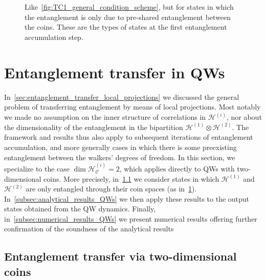 \documentclass[
	aps, pra,
	superscriptaddress, twocolumn,
	floatfix,
	10pt
]{revtex4-1}
\newcommand{\calC}{{\mathcal{C}}}
\newcommand{\calH}{{\mathcal{H}}}
\newcommand{\HC}{\calH_\calC}
\begin{document}
\begin{figure}
    \centering
    
    \caption{
        Like~\cref{fig:TC1_general_condition_scheme}, but for states in which the entanglement is only due to pre-shared entanglement between the coins. These are the types of states at the first entanglement accumulation step.
    }
    \label{fig:TC1_condition_scheme}
\end{figure}

\section{Entanglement transfer in QWs}
\label{sec:entanglement_transfer_in_QWs}

In~\cref{sec:entanglement_transfer_local_projections} we discussed the general problem of transferring entanglement by means of local projections.
Most notably we made no assumption on the inner structure of correlations in $\calH^{(i)}$, nor about the dimensionality of the entanglement in the bipartition $\calH^{(1)}\otimes\calH^{(2)}$. The framework and results thus also apply to subsequent iterations of entanglement accumulation, and more generally cases in which there is some preexisting entanglement between the walkers' degrees of freedom.
In this section, we specialize to the case $\dim\HC^{(i)}=2$, which applies directly to QWs with two-dimensional coins.
More precisely, in~\cref{subsec:generalsolution_firstiteration_2Dcoin} we consider states in which $\calH^{(1)}$ and $\calH^{(2)}$ are only entangled through their coin spaces (as in~\cref{fig:TC1_condition_scheme}).
In~\cref{subsec:analytical_results_QWs} we then apply these results to the output states obtained from the QW dynamics.
Finally, in~\cref{subsec:numerical_results_QWs} we present numerical results offering further confirmation of the soundness of the analytical results

\subsection{Entanglement transfer via two-dimensional coins}
\label{subsec:generalsolution_firstiteration_2Dcoin}
\end{document}
